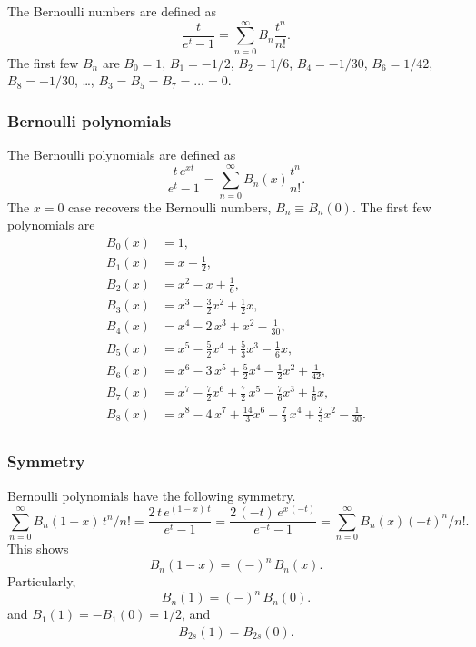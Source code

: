 \documentclass[aip,jcp,preprint,notitlepage, superscriptaddress]{revtex4-1}
\begin{document}
The Bernoulli numbers are defined as
%
\begin{equation}
  \frac{ t }
  {e^t - 1}
=
\sum_{n = 0}^\infty
  B_n \frac{ t^n } { n! }.
\label{eq:Bernoulli_number}
\end{equation}
%
The first few $B_n$ are\cite{
  whittaker, arfken, abramowitz, wang_specfunc}
$B_0 = 1$,
$B_1 = -1/2$,
$B_2 = 1/6$,
$B_4 = -1/30$,
$B_6 = 1/42$,
$B_8 = -1/30$,
\dots,
$B_3 = B_5 = B_7 = \dots = 0$.



\subsubsection{Bernoulli polynomials}



The Bernoulli polynomials are defined as
%
\begin{equation}
  \frac{ t \, e^{x t} }
  {e^t - 1}
=
\sum_{n = 0}^\infty
  B_n(x) \frac{ t^n } { n! }.
\label{eq:Bernoulli_polynomial}
\end{equation}
%
The $x = 0$ case
recovers the Bernoulli numbers,
$B_n \equiv B_n(0)$.
%
The first few polynomials are\cite{
  whittaker, arfken, abramowitz, wang_specfunc}
\begin{align*}
B_0(x) &= 1, \\
B_1(x) &= x - \frac 1 2, \\
B_2(x) &= x^2 - x + \frac 1 6, \\
B_3(x) &= x^3 - \frac 3 2 x^2 + \frac 1 2 x, \\
B_4(x) &= x^4 - 2 \, x^3 + x^2 - \frac{1}{30}, \\
B_5(x) &= x^5 - \frac 5 2 x^4 + \frac 5 3 x^3 - \frac{1}{6} x, \\
B_6(x) &= x^6 - 3 \, x^5 + \frac 5 2 x^4 - \frac 1 2 x^2 + \frac{1}{42}, \\
B_7(x) &= x^7 - \frac 7 2 x^6 + \frac 7 2 \, x^5 - \frac 7 6 x^3 + \frac 1 6 x, \\
B_8(x) &= x^8 - 4 \, x^7 + \frac{14} 3 x^6 - \frac 7 3 \, x^4 + \frac 2 3 x^2 - \frac{1}{30}. \\
\end{align*}




\subsubsection{Symmetry}



Bernoulli polynomials have the following symmetry.
%
\begin{equation*}
\sum_{n = 0}^\infty
B_n(1 - x) \, t^n/n!
=
\frac{ 2 \, t \, e^{(1 - x) \, t} }
{ e^t - 1 }
=
\frac{ 2 \, (-t) \, e^{ x \, (-t)} }
{ e^{-t} - 1 }
=
\sum_{n = 0}^\infty
B_n(x) (-t)^n / n!.
\end{equation*}
%
This shows
\[
B_n(1 - x) = (-)^n \, B_n(x).
\]
Particularly,
\[
B_n(1) = (-)^n \, B_n(0).
\]
and $B_1(1) = -B_1(0) = 1/2$, and
\begin{align}
B_{2s}(1) = B_{2s}(0).
\label{eq:Bernoulli1_even}
\end{align}
\end{document}

